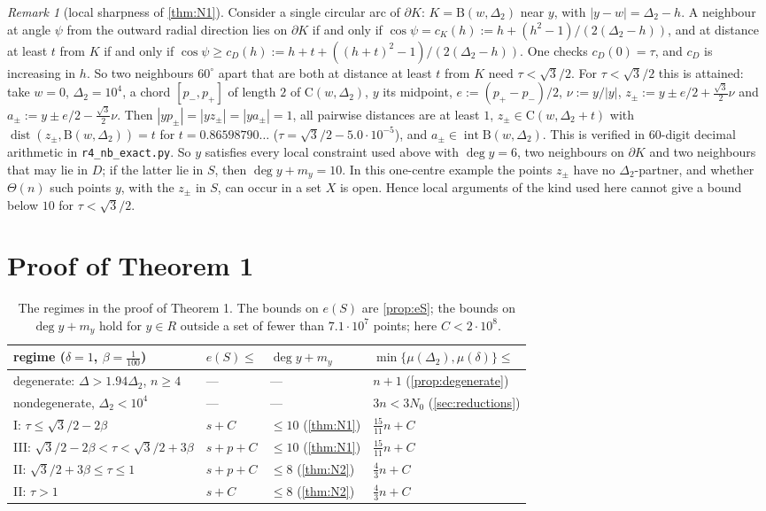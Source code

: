 \documentclass[11pt]{amsart}
\theoremstyle{definition}
\theoremstyle{remark}
\newtheorem{remark}[theorem]{Remark}
\newcommand{\Dt}{\Delta_2}
\newcommand{\mult}{\mu}
\newcommand{\dist}{\operatorname{dist}}
\newcommand{\Cc}{\mathrm{C}}      %
\newcommand{\Dd}{\mathrm{B}}      %
\begin{document}
\begin{remark}[local sharpness of \cref{thm:N1}]\label{rem:sharpN1}
Consider a single circular arc of $\partial K$: $K=\Dd(w,\Dt)$ near $y$, with $|y-w|=\Dt-h$. A neighbour at angle $\psi$ from the outward radial direction lies on $\partial K$ if and only if $\cos\psi=c_K(h):=h+(h^2-1)/(2(\Dt-h))$, and at distance at least $t$ from $K$ if and only if $\cos\psi\ge c_D(h):=h+t+((h+t)^2-1)/(2(\Dt-h))$. One checks $c_D(0)=\tau$, and $c_D$ is increasing in $h$. So two neighbours $60^\circ$ apart that are both at distance at least $t$ from $K$ need $\tau<\sqrt3/2$. For $\tau<\sqrt3/2$ this is attained: take $w=0$, $\Dt=10^4$, a chord $[p_-,p_+]$ of length $2$ of $\Cc(w,\Dt)$, $y$ its midpoint, $e:=(p_+-p_-)/2$, $\nu:=y/|y|$, $z_\pm:=y\pm e/2+\frac{\sqrt3}2\nu$ and $a_\pm:=y\pm e/2-\frac{\sqrt3}2\nu$. Then $|yp_\pm|=|yz_\pm|=|ya_\pm|=1$, all pairwise distances are at least $1$, $z_\pm\in\Cc(w,\Dt+t)$ with $\dist(z_\pm,\Dd(w,\Dt))=t$ for $t=0.86598790\ldots$ ($\tau=\sqrt3/2-5.0\cdot10^{-5}$), and $a_\pm\in\operatorname{int}\Dd(w,\Dt)$. This is verified in $60$-digit decimal arithmetic in \texttt{r4\_nb\_exact.py}. So $y$ satisfies every local constraint used above with $\deg y=6$, two neighbours on $\partial K$ and two neighbours that may lie in $D$; if the latter lie in $S$, then $\deg y+m_y=10$. In this one-centre example the points $z_\pm$ have no $\Dt$-partner, and whether $\Theta(n)$ such points $y$, with the $z_\pm$ in $S$, can occur in a set $X$ is open. Hence local arguments of the kind used here cannot give a bound below $10$ for $\tau<\sqrt3/2$.
\end{remark}

\section{Proof of Theorem 1}\label{sec:proof15}

\begin{table}[ht]
\centering
\renewcommand{\arraystretch}{1.2}
\begin{tabular}{@{}llll@{}}
\toprule
regime ($\delta=1$, $\beta=\frac1{100}$) & $e(S)\le$ & $\deg y+m_y$ & $\min\{\mult(\Dt),\mult(\delta)\}\le$\\
\midrule
degenerate: $\Delta>1.94\Dt$, $n\ge4$ & --- & --- & $n+1$ (\cref{prop:degenerate})\\
nondegenerate, $\Dt<10^4$ & --- & --- & $3n<3N_0$ (\cref{sec:reductions})\\
I: $\tau\le\sqrt3/2-2\beta$ & $s+C$ & $\le10$ (\cref{thm:N1}) & $\frac{15}{11}n+C$\\
III: $\sqrt3/2-2\beta<\tau<\sqrt3/2+3\beta$ & $s+p+C$ & $\le10$ (\cref{thm:N1}) & $\frac{15}{11}n+C$\\
II: $\sqrt3/2+3\beta\le\tau\le1$ & $s+p+C$ & $\le8$ (\cref{thm:N2}) & $\frac43n+C$\\
II: $\tau>1$ & $s+C$ & $\le8$ (\cref{thm:N2}) & $\frac43n+C$\\
\bottomrule
\end{tabular}
\caption{The regimes in the proof of Theorem 1. The bounds on $e(S)$ are \cref{prop:eS}; the bounds on $\deg y+m_y$ hold for $y\in R$ outside a set of fewer than $7.1\cdot10^7$ points; here $C<2\cdot10^8$.}
\end{table}
\end{document}
